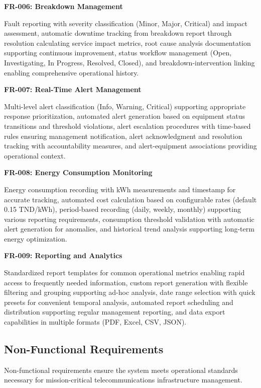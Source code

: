 \textbf{FR-006: Breakdown Management}

Fault reporting with severity classification (Minor, Major, Critical) and impact assessment, automatic downtime tracking from breakdown report through resolution calculating service impact metrics, root cause analysis documentation supporting continuous improvement, status workflow management (Open, Investigating, In Progress, Resolved, Closed), and breakdown-intervention linking enabling comprehensive operational history.

\textbf{FR-007: Real-Time Alert Management}

Multi-level alert classification (Info, Warning, Critical) supporting appropriate response prioritization, automated alert generation based on equipment status transitions and threshold violations, alert escalation procedures with time-based rules ensuring management notification, alert acknowledgment and resolution tracking with accountability measures, and alert-equipment associations providing operational context.

\textbf{FR-008: Energy Consumption Monitoring}

Energy consumption recording with kWh measurements and timestamp for accurate tracking, automated cost calculation based on configurable rates (default 0.15 TND/kWh), period-based recording (daily, weekly, monthly) supporting various reporting requirements, consumption threshold validation with automatic alert generation for anomalies, and historical trend analysis supporting long-term energy optimization.

\textbf{FR-009: Reporting and Analytics}

Standardized report templates for common operational metrics enabling rapid access to frequently needed information, custom report generation with flexible filtering and grouping supporting ad-hoc analysis, date range selection with quick presets for convenient temporal analysis, automated report scheduling and distribution supporting regular management reporting, and data export capabilities in multiple formats (PDF, Excel, CSV, JSON).

\subsection{Non-Functional Requirements}

Non-functional requirements ensure the system meets operational standards necessary for mission-critical telecommunications infrastructure management.

